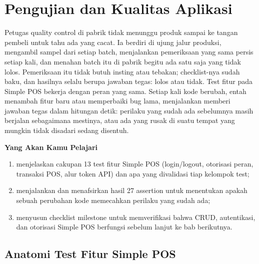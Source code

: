 
\chapter{Pengujian dan Kualitas Aplikasi}
\label{ch:pengujian-aplikasi}


Petugas quality control di pabrik tidak menunggu produk sampai ke tangan
pembeli untuk tahu ada yang cacat. Ia berdiri di ujung jalur produksi,
mengambil sampel dari setiap batch, menjalankan pemeriksaan yang sama
persis setiap kali, dan menahan batch itu di pabrik begitu ada satu saja
yang tidak lolos. Pemeriksaan itu tidak butuh insting atau tebakan;
checklist-nya sudah baku, dan hasilnya selalu berupa jawaban tegas: lolos
atau tidak. Test fitur pada Simple POS bekerja dengan peran yang sama.
Setiap kali kode berubah, entah menambah fitur baru atau memperbaiki bug
lama, menjalankan  memberi jawaban tegas dalam
hitungan detik: perilaku yang sudah ada sebelumnya masih berjalan
sebagaimana mestinya, atau ada yang rusak di suatu tempat yang mungkin
tidak disadari sedang disentuh.

\textbf{Yang Akan Kamu Pelajari}

\begin{enumerate}
  \item menjelaskan cakupan 13 test fitur Simple POS (login/logout, otorisasi peran, transaksi POS, alur token API) dan apa yang divalidasi tiap kelompok test;
  \item menjalankan  dan menafsirkan hasil 27 assertion untuk menentukan apakah sebuah perubahan kode memecahkan perilaku yang sudah ada;
  \item menyusun checklist milestone untuk memverifikasi bahwa CRUD, autentikasi, dan otorisasi Simple POS berfungsi sebelum lanjut ke bab berikutnya.
\end{enumerate}

\section{Anatomi Test Fitur Simple POS}
\label{sec:pengujian-aplikasi-1}

